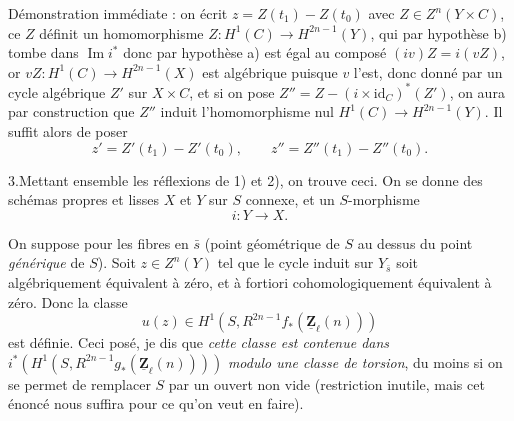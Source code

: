 \documentclass[11pt,a4paper]{article}
\begin{document}
Démonstration immédiate : on écrit $z = Z(t_1) - Z(t_0)$ avec $Z \in Z^n(Y \times
C)$, ce $Z$ définit un homomorphisme $Z\colon H^1(C) \to H^{2n-1}(Y)$, qui par
hypothèse b) tombe dans $\operatorname{Im} i^{*}$ donc par hypothèse a) est égal
au composé $(iv)Z = i(vZ)$, or $vZ\colon H^1(C) \to H^{2n-1}(X)$ est algébrique
puisque $v$ l'est, donc donné par un cycle algébrique $Z'$ sur $X \times C$, et si
on pose $Z'' = Z - (i \times \mathrm{id}_C)^{*}(Z')$, on aura par construction que
$Z''$ induit l'homomorphisme nul $H^1(C) \to H^{2n-1}(Y)$. Il suffit alors de
poser
\[ z' = Z'(t_1) - Z'(t_0), \qquad z'' = Z''(t_1) - Z''(t_0) . \]

3.\quad Mettant ensemble les réflexions de 1) et 2), on trouve ceci. On se donne
des schémas propres et lisses $X$ et $Y$ sur $S$  connexe, et un
$S$-morphisme
\[ i\colon Y \longrightarrow X . \]



On suppose  pour les fibres en $\bar s$ (point géométrique de $S$ au
dessus du point \emph{générique} de $S$). Soit $z \in Z^n(Y)$ tel que le cycle induit sur $Y_{\bar s}$
soit algébriquement équivalent à zéro, et à fortiori cohomologiquement équivalent
à zéro. Donc la classe
\[ u(z) \in H^1(S, R^{2n-1} f_{*}(\underline{\mathbf{Z}}_\ell(n))) \]
est définie. Ceci posé, je dis que \emph{cette classe est contenue dans}
$i^{*}(H^1(S, R^{2n-1} g_{*}(\underline{\mathbf{Z}}_\ell(n))))$ \emph{modulo une
classe de torsion}, du moins si on se permet de remplacer $S$ par un ouvert non
vide (restriction  inutile, mais cet énoncé nous suffira pour ce
qu'on veut en faire).
\end{document}
